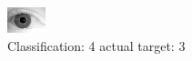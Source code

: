 \begin{figure}[h!]
\begin{center}
\includegraphics[width=0.60\columnwidth]{figures/ID2165_class_4_target_3.png}
\end{center}
\caption{ Classification: 4 actual target: 3}
\label{fig:ID2165_class_4_target_3}
\end{figure}
